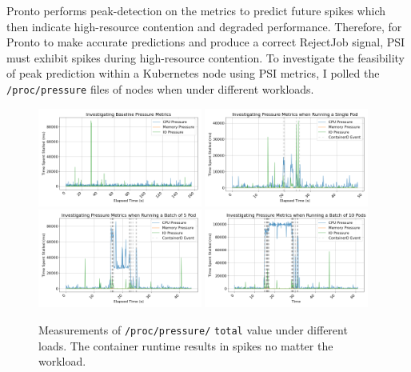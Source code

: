 Pronto performs peak-detection on the metrics to predict future spikes which
then indicate high-resource contention and degraded performance. Therefore, for
Pronto to make accurate predictions and produce a correct RejectJob signal, PSI
must exhibit spikes during high-resource contention. To investigate the
feasibility of peak prediction within a Kubernetes node using PSI metrics, I
polled the \verb|/proc/pressure| files of nodes when under different workloads.

\begin{figure}[htbp!]
    \centering
    \includegraphics[width=0.48\textwidth]{images/pressure-baseline.png}
    \includegraphics[width=0.48\textwidth]{images/pressure-single.png} \\
    \includegraphics[width=0.48\textwidth]{images/pressure-smallbatch.png}
    \includegraphics[width=0.48\textwidth]{images/pressure-bigbatch.png}
    \caption{Measurements of \texttt{/proc/pressure/} \texttt{total} value under
    different loads. The container runtime results in spikes no matter the
    workload.}
    \label{fig:pressure}
\end{figure}

